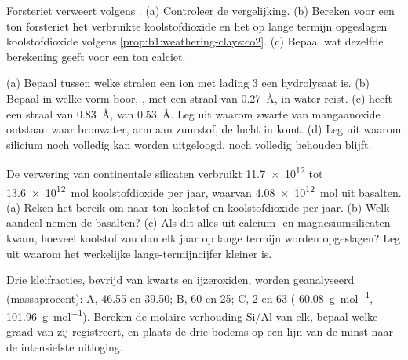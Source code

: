 \begin{exercise}[$\star\star$]\label{exo:b1:weathering-clays:9}
Forsteriet  verweert volgens
. (a) Controleer de
vergelijking. (b) Bereken voor een ton forsteriet het verbruikte koolstofdioxide en
het op lange termijn opgeslagen koolstofdioxide volgens
\cref{prop:b1:weathering-clays:co2}. (c) Bepaal wat dezelfde berekening geeft voor een ton calciet.
\end{exercise}

\begin{exercise}[$\star\star\star$]\label{exo:b1:weathering-clays:10}
(a) Bepaal tussen welke stralen een ion met lading 3 een hydrolysaat is. (b) Bepaal in welke vorm boor, , met een straal van \qty{0.27}{\angstrom}, in water reist. (c)  heeft een straal van \qty{0.83}{\angstrom},  van \qty{0.53}{\angstrom}. Leg uit waarom zwarte  van mangaanoxide ontstaan waar bronwater, arm aan zuurstof, de lucht in komt. (d) Leg uit waarom silicium noch volledig kan worden uitgeloogd, noch volledig behouden blijft.
\end{exercise}

\begin{exercise}[$\star\star\star$]\label{exo:b1:weathering-clays:11}
De verwering van continentale silicaten verbruikt \num{11.7e12} tot \qty{13.6e12}{mol} koolstofdioxide per jaar, waarvan \qty{4.08e12}{mol} uit basalten. (a) Reken het bereik om naar ton koolstof en koolstofdioxide per jaar. (b) Welk aandeel nemen de basalten? (c) Als dit alles uit calcium- en magnesiumsilicaten kwam, hoeveel koolstof zou dan elk jaar op lange termijn worden opgeslagen? Leg uit waarom het werkelijke lange-termijncijfer kleiner is.
\end{exercise}

\begin{exercise}[$\star\star\star$]\label{exo:b1:weathering-clays:12}
Drie kleifracties, bevrijd van kwarts en ijzeroxiden, worden geanalyseerd (massaprocent): A,  \num{46.55} en  \num{39.50}; B,  60 en  25; C,  2 en  63 ( \qty{60.08}{g.mol^{-1}},  \qty{101.96}{g.mol^{-1}}). Bereken de molaire verhouding Si/Al van elk, bepaal welke graad van  zij registreert, en plaats de drie bodems op een lijn van de minst naar de intensiefste uitloging.
\end{exercise}


